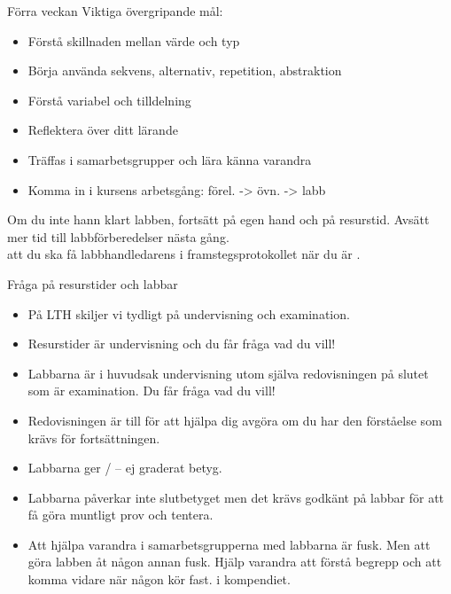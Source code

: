 

\begin{SlideExtra}{Förra veckan}
Viktiga övergripande mål:
\begin{itemize}
\item Förstå skillnaden mellan värde och typ
\item Börja använda sekvens, alternativ, repetition, abstraktion
\item Förstå variabel och tilldelning
\item Reflektera över ditt lärande
\item Träffas i samarbetsgrupper och lära känna varandra
\item Komma in i kursens arbetsgång: förel. -> övn. -> labb
\end{itemize}
Om du inte hann klart labben, fortsätt på egen hand och på resurstid. Avsätt mer tid till labbförberedelser nästa gång.
\\ 
 att du ska få labbhandledarens  i framstegsprotokollet när du är .
\end{SlideExtra}

\begin{SlideExtra}{Fråga på resurstider och labbar}
\begin{itemize}
  \item På LTH skiljer vi tydligt på undervisning och examination.
  \item Resurstider är undervisning och du får fråga vad du vill!
  \item Labbarna är i huvudsak undervisning utom själva redovisningen på slutet som är examination. Du får fråga vad du vill!
  \item Redovisningen är till för att hjälpa dig avgöra om du har den förståelse som krävs för fortsättningen.
  \item Labbarna ger / -- ej graderat betyg. 
  \item Labbarna påverkar inte slutbetyget men det krävs godkänt på  labbar för att få göra muntligt prov och tentera.
  \item Att hjälpa varandra i samarbetsgrupperna med labbarna är  fusk. Men att göra labben åt någon annan  fusk. Hjälp varandra att förstå begrepp och att komma vidare när någon kör fast.  i kompendiet.
\end{itemize}  
\end{SlideExtra}


